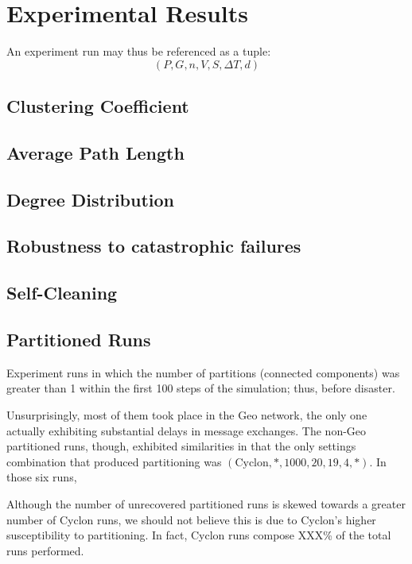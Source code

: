 \documentclass[a4paper]{ifacconf}
\newcommand{\DT}{\ensuremath{{\Delta}T}}
\begin{document}
\section{Experimental Results}

An experiment run may thus be referenced as a tuple:
$$
(P, G, n, V, S, \DT, d)
$$

\subsection{Clustering Coefficient}



\subsection{Average Path Length}

\subsection{Degree Distribution}

\subsection{Robustness to catastrophic failures}

\subsection{Self-Cleaning}

\subsection{Partitioned Runs}

Experiment runs in which the number of partitions (connected components) was greater than 1 within the first 100 steps of the simulation; thus, before disaster.

Unsurprisingly, most of them took place in the Geo network, the only one actually exhibiting substantial delays in message exchanges.
The non-Geo partitioned runs, though, exhibited similarities in that the only settings combination that produced partitioning was $(\text{Cyclon}, *, 1000, 20, 19, 4, *)$.
In those six runs, 

Although the number of unrecovered partitioned runs is skewed towards a greater number of Cyclon runs, we should not believe this is due to Cyclon's higher susceptibility to partitioning.
In fact, Cyclon runs compose XXX\% of the total runs performed.
\end{document}
